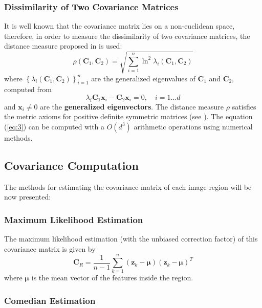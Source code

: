 \documentclass[11pt]{article}
\theoremstyle{definition}
\theoremstyle{remark}
\theoremstyle{remark}
\theoremstyle{remark}
\begin{document}
\subsubsection{Dissimilarity of Two Covariance Matrices} \label{subsub:dis}

It is well known that the covariance matrix lies on a non-euclidean space,
therefore, in order to measure the dissimilarity of two covariance matrices, the
distance measure proposed in \parencite{forstner2003metric} is used:
%
\begin{equation}\label{eq:3}
  \rho\left(\mathbf{C}_{1}, \mathbf{C}_{2}\right)=\sqrt{\sum_{i=1}^{n} \ln ^{2} \lambda_{i}\left(\mathbf{C}_{1}, \mathbf{C}_{2}\right)}
\end{equation}
%
where
$\left\{\lambda_{i}\left(\mathbf{C}_{1}, \mathbf{C}_{2}\right)\right\}_{i=1}^n$
are the generalized eigenvalues of $\mathbf{C}_{1}$ and $\mathbf{C}_{2},$
computed from
%
\[
  \lambda_{i} \mathbf{C}_{1} \mathbf{x}_{i}-\mathbf{C}_{2} \mathbf{x}_{i}=0, \quad i=1 \ldots d
\]
%
and $\mathbf{x}_{i} \neq 0$ are the \textbf{generalized eigenvectors}. The
distance measure $\rho$ satisfies the metric axioms for positive definite
symmetric matrices (see \parencite{tuzel2006}). The equation (\ref{eq:3}) can be
computed with a $O\left(d^{3}\right)$ arithmetic operations using numerical
methods.
\subsection{Covariance Computation}

The methods for estimating the covariance matrix of each image region will be
now presented:

\subsubsection{Maximum Likelihood Estimation}

The maximum likelihood estimation (with the unbiased correction factor) of this
covariance matrix is given by
%
\begin{equation}
  \mathbf{C}_{R}=\frac{1}{n-1} \sum_{k=1}^{n}\left(\mathbf{z}_{k}-\boldsymbol{\mu}\right)\left(\mathbf{z}_{k}-\boldsymbol{\mu}\right)^{T}
\end{equation}
%
where $\boldsymbol{\mu}$ is the mean vector of the features inside the region.

\subsubsection{Comedian Estimation}
\end{document}
